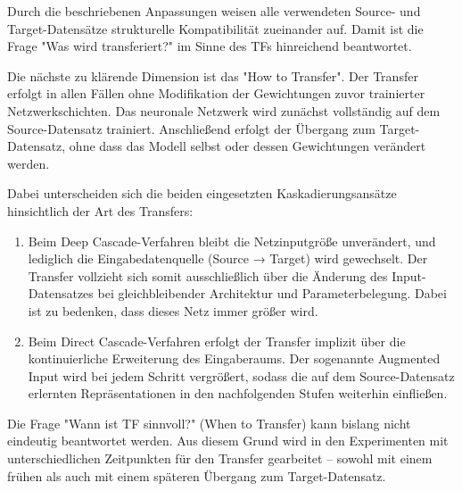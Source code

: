 Durch die beschriebenen Anpassungen weisen alle verwendeten Source- und Target-Datensätze strukturelle Kompatibilität zueinander auf. Damit ist 
die Frage "Was wird transferiert?" im Sinne des TFs hinreichend beantwortet.

Die nächste zu klärende Dimension ist das "How to Transfer". Der Transfer erfolgt in allen Fällen ohne Modifikation der Gewichtungen zuvor 
trainierter Netzwerkschichten. Das neuronale Netzwerk wird zunächst vollständig auf dem Source-Datensatz trainiert. Anschließend erfolgt der 
Übergang zum Target-Datensatz, ohne dass das Modell selbst oder dessen Gewichtungen verändert werden.

Dabei unterscheiden sich die beiden eingesetzten Kaskadierungsansätze hinsichtlich der Art des Transfers:
\begin{enumerate}
    \item Beim Deep Cascade-Verfahren bleibt die Netzinputgröße unverändert, und lediglich die Eingabedatenquelle (Source → Target) wird gewechselt. 
    Der Transfer vollzieht sich somit ausschließlich über die Änderung des Input-Datensatzes bei gleichbleibender Architektur und 
    Parameterbelegung. Dabei ist zu bedenken, dass dieses Netz immer größer wird.
    \item Beim Direct Cascade-Verfahren erfolgt der Transfer implizit über die kontinuierliche Erweiterung des Eingaberaums. Der sogenannte 
    Augmented Input wird bei jedem Schritt vergrößert, sodass die auf dem Source-Datensatz erlernten Repräsentationen in den nachfolgenden 
    Stufen weiterhin einfließen.
\end{enumerate}
    
    
Die Frage "Wann ist TF sinnvoll?" (When to Transfer) kann bislang nicht eindeutig beantwortet werden. Aus diesem Grund wird in 
den Experimenten mit unterschiedlichen Zeitpunkten für den Transfer gearbeitet – sowohl mit einem frühen als auch mit einem späteren Übergang 
zum Target-Datensatz.
